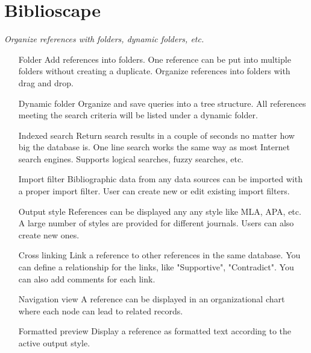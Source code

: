 \cbend

\clearpage
\section{Biblioscape}
\label{sec:biblioscapefeat}


                                                               


\textit{Organize references with folders, dynamic folders, etc.}
\begin{itemize}
 \item[Folder] \label{biblioscapefolder}
Add references into folders. One reference can be put into
 multiple folders without creating a duplicate. Organize references
 into folders with drag and drop.

 
 \item[Dynamic folder] Organize and save queries into a tree structure.
 All references meeting the search criteria will be listed under a
 dynamic folder.

 \item[Indexed search] Return search results in a couple of seconds no
 matter how big the database is. One line search works the same
 way as most Internet search engines. Supports logical searches,
 fuzzy searches, etc.

 \item[Import filter] Bibliographic data from any data sources can be
 imported with a proper import filter. User can create new or edit
 existing import filters.

 \item[Output style] References can be displayed any any style like MLA,
 APA, etc. A large number of styles are provided for different
 journals. Users can also create new ones.

 \item[Cross linking] Link a reference to other references in the same
 database. You can define a relationship for the links, like
 "Supportive", "Contradict". You can also add comments for each
 link.

 \item[Navigation view] A reference can be displayed in an organizational
 chart where each node can lead to related records.

 \item[Formatted preview] Display a reference as formatted text
 according to the active output style. 


\end{itemize}
